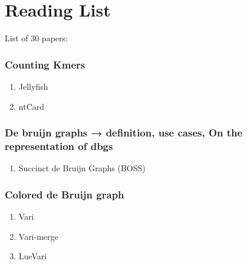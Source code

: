 
\section{Reading List}
\label{chap:readingList}

List of 30 papers:
\subsubsection{Counting Kmers}
\begin{enumerate}
    \item Jellyfish
    \item ntCard
\end{enumerate}
\subsubsection{De bruijn graphs → definition, use cases, On the representation of dbgs}
\begin{enumerate}
    \item Succinct de Bruijn Graphs (BOSS)
\end{enumerate}
\subsubsection{Colored de Bruijn graph}
\begin{enumerate}
    \item Vari
    \item Vari-merge
    \item LueVari
\end{enumerate}
